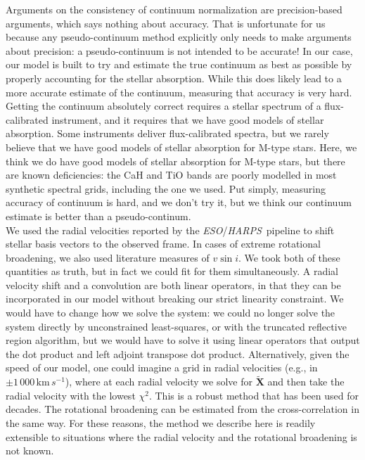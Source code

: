 \documentclass[modern]{aastex631}
\newcommand{\project}[1]{\textit{#1}}
\renewcommand{\vec}[1]{\mathbf{#1}}
\newcommand{\eso}{\project{ESO}}
\newcommand{\harps}{\project{HARPS}}
\begin{document}
Arguments on the consistency of continuum normalization are precision-based arguments, which says nothing about accuracy. That is unfortunate for us because any pseudo-continuum method explicitly only needs to make arguments about precision: a pseudo-continuum is not intended to be accurate! In our case, our model is built to try and estimate the true continuum as best as possible by properly accounting for the stellar absorption. While this does likely lead to a more accurate estimate of the continuum, measuring that accuracy is very hard. Getting the continuum absolutely correct requires a stellar spectrum of a flux-calibrated instrument, and it requires that we have good models of stellar absorption. Some instruments deliver flux-calibrated spectra, but we rarely believe that we have good models of stellar absorption for M-type stars. Here, we think we do have good models of stellar absorption for M-type stars, but there are known deficiencies: the CaH and TiO bands are poorly modelled in most synthetic spectral grids, including the one we used. %
Put simply, measuring accuracy of continuum is hard, and we don't try it, but we think our continuum estimate is better than a pseudo-continum.\\

We used the radial velocities reported by the \eso/\harps\ pipeline to shift stellar basis vectors to the observed frame. In cases of extreme rotational broadening, we also used literature measures of $v\sin{i}$. We took both of these quantities as truth, but in fact we could fit for them simultaneously. A radial velocity shift and a convolution are both linear operators, in that they can be incorporated in our model without breaking our strict linearity constraint. We would have to change how we solve the system: we could no longer solve the system directly by unconstrained least-squares, or with the truncated reflective region algorithm, but we would have to solve it using linear operators that output the dot product and left adjoint transpose dot product. Alternatively, given the speed of our model, one could imagine a grid in radial velocities (e.g., in $\pm1\,000\,\mathrm{km}\,s^{-1}$), where at each radial velocity we solve for $\vec{\tilde{X}}$ and then take the radial velocity with the lowest $\chi^2$. This is a robust method that has been used for decades. The rotational broadening can be estimated from the cross-correlation in the same way. For these reasons, the method we describe here is readily extensible to situations where the radial velocity and the rotational broadening is not known.\\
\end{document}

